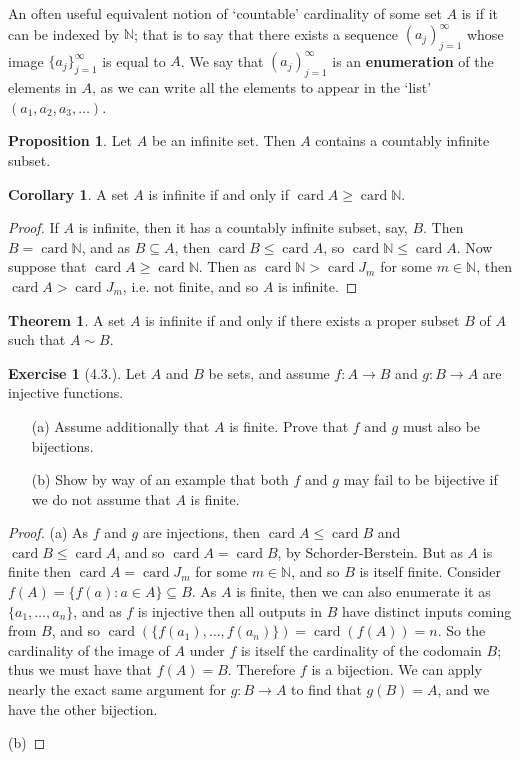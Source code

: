 \documentclass[9pt,reqno]{amsart}
\theoremstyle{definition}
\newtheorem{theorem}{Theorem}[section]
\newtheorem{exercise}{Exercise}[section]
\newtheorem{prop}{Proposition}[section]
\newtheorem{coro}{Corollary}[section]
\newcommand{\nn}{\mathbb N}
\DeclareMathOperator{\card}{card}
\begin{document}
An often useful equivalent notion of `countable' cardinality of some set $A$ is if it can be indexed by $\nn$; that is to say that there exists a sequence $(a_j)_{j=1}^\infty$ whose image $\{a_j \}_{j=1}^\infty$ is equal to $A$. We say that $(a_j)_{j=1}^\infty$ is an \textbf{enumeration} of the elements in $A$, as we can write all the elements to appear in the `list' $(a_1, a_2, a_3, \ldots)$. 
\begin{prop}
Let $A$ be an infinite set. Then $A$ contains a countably infinite subset. 	
\end{prop}
\begin{coro}
A set $A$ is infinite if and only if $\card A \geq \card \nn$.	
\end{coro}
\begin{proof}
	If $A$ is infinite, then it has a countably infinite subset, say, $B$. Then $B = \card \nn$, and as $B \subseteq A$, then $\card B \leq \card A$, so $\card \nn \leq \card A$. Now suppose that $\card A \geq \card \nn$. Then as $\card \nn > \card J_m$ for some $m \in \nn$, then $\card A > \card J_m$, i.e. not finite, and so $A$ is infinite. 
\end{proof}
\begin{theorem}
A set $A$ is infinite if and only if there exists a proper subset $B$ of $A$ such that $A \sim B$.
\end{theorem}
\begin{exercise}[4.3.] Let $A$ and $B$ be sets, and assume $f \colon A \to B$ and $g \colon B \to A$ are injective functions.
\begin{itemize}
	\item [(a)] Assume additionally that $A$ is finite. Prove that $f$ and $g$ must also be bijections.
	\item [(b)] Show by way of an example that both $f$ and $g$ may fail to be bijective if we do not assume that $A$ is finite. 
\end{itemize}
\end{exercise}
\begin{proof}
	(a) As $f$ and $g$ are injections, then $\card A \leq \card B$ and $\card B \leq \card A$, and so $\card A = \card B$, by Schorder-Berstein. But as $A$ is finite then $\card A = \card J_m$ for some $m \in \nn$, and so $B$ is itself finite. Consider $f(A) = \{f(a) \colon a \in A \} \subseteq B$. As $A$ is finite, then we can also enumerate it as $\{a_1, \ldots, a_n \}$, and as $f$ is injective then all outputs in $B$ have distinct inputs coming from $B$, and so $ \card ( \{f(a_1), \ldots, f(a_n) \}) =\card (f(A)) = n$. So the cardinality of the image of $A$ under $f$ is itself the cardinality of the codomain $B$; thus we must have that $f(A) = B$. Therefore $f$ is a bijection. We can apply nearly the exact same argument for $g \colon B \to A$ to find that $g(B) = A$, and we have the other bijection. 
	
	(b)
\end{proof}
\end{document}
